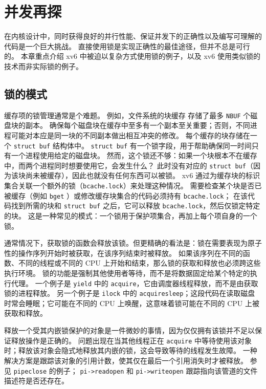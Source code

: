 \chapter{并发再探}
\label{CH:LOCK2}

在内核设计中，同时获得良好的并行性能、保证并发下的正确性以及编写可理解的代码是一个巨大挑战。
直接使用锁是实现正确性的最佳途径，但并不总是可行的。
本章重点介绍 xv6 中被迫以复杂方式使用锁的例子，以及 xv6 使用类似锁的技术而非实际锁的例子。

\section{锁的模式}

缓存项的锁管理通常是个难题。
例如，文件系统的块缓存  存储了最多 {\tt NBUF} 个磁盘块的副本。
确保每个磁盘块在缓存中至多有一个副本至关重要；否则，不同进程可能对本应是同一块的不同副本做出相互冲突的修改。
每个缓存的块存储在一个 {\tt struct buf}  结构体中。
{\tt struct buf} 有一个锁字段，用于帮助确保同一时间只有一个进程使用给定的磁盘块。
然而，这个锁还不够：如果一个块根本不在缓存中，而两个进程同时想要使用它，会发生什么？
此时没有对应的 {\tt struct buf}（因为该块尚未被缓存），因此也就没有任何东西可以被锁。
xv6 通过为缓存块的标识集合关联一个额外的锁（{\tt bcache.lock}）来处理这种情况。
需要检查某个块是否已被缓存（例如 {\tt bget} ）或修改缓存块集合的代码必须持有 {\tt bcache.lock}；
在该代码找到所需的块和 {\tt struct buf} 之后，它可以释放 {\tt bcache.lock}，然后仅锁定特定的块。
这是一种常见的模式：一个锁用于保护项集合，再加上每个项自身的一个锁。

通常情况下，获取锁的函数会释放该锁。但更精确的看法是：锁在需要表现为原子性的操作序列开始时被获取，在该序列结束时被释放。
如果该序列在不同的函数、不同的线程或不同的 CPU 上开始和结束，那么锁的获取和释放也必须跨这些执行环境。
锁的功能是强制其他使用者等待，而不是将数据固定给某个特定的执行代理。
一个例子是 {\tt yield}  中的 {\tt acquire}，它由调度器线程释放，而不是由获取锁的进程释放。
另一个例子是 {\tt ilock}  中的 {\tt acquiresleep}；这段代码在读取磁盘时常会睡眠；它可能在不同的 CPU 上唤醒，这意味着锁可能在不同的 CPU 上被获取和释放。

释放一个受其内嵌锁保护的对象是一件微妙的事情，因为仅仅拥有该锁并不足以保证释放操作是正确的。
问题出现在当其他线程正在 {\tt acquire} 中等待使用该对象时；释放该对象会隐式地释放其内嵌的锁，这会导致等待的线程发生故障。
一种解决方案是跟踪该对象的引用计数，使其仅在最后一个引用消失时才被释放。
参见 {\tt pipeclose}  的例子；
{\tt pi->readopen} 和 {\tt pi->writeopen} 跟踪指向该管道的文件描述符是否还存在。

